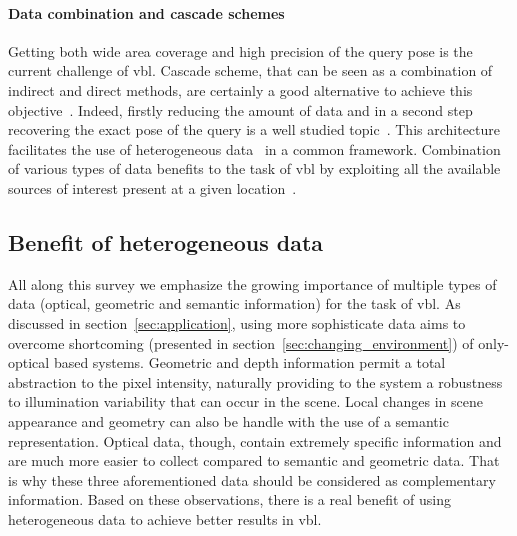         \paragraph{Data combination and cascade schemes}
        	Getting both wide area coverage and high precision of the query pose is the current challenge of \ac{vbl}. Cascade scheme, that can be seen as a combination of indirect and direct methods, are certainly a good alternative to achieve this objective~\citep{Sattler2017}. Indeed, firstly reducing the amount of data and in a second step recovering the exact pose of the query is a well studied topic~\citep{Rubio2015,Azzi2016,Song2016,Meng2016,Sattler2017}. This architecture facilitates the use of heterogeneous data~\citep{Lu2015} in a common framework. Combination of various types of data benefits to the task of \ac{vbl} by exploiting all the available sources of interest present at a given location~\citep{Li2016}.
            
	\subsection{Benefit of heterogeneous data}
    	All along this survey we emphasize the growing importance of multiple types of data (optical, geometric and semantic information) for the task of \ac{vbl}. As discussed in section~\ref{sec:application}, using more sophisticate data aims to overcome shortcoming (presented in section~\ref{sec:changing_environment}) of only-optical based systems. Geometric and depth information permit a total abstraction to the pixel intensity, naturally providing to the system a robustness to illumination variability that can occur in the scene. Local changes in scene appearance and geometry can also be handle with the use of a semantic representation. Optical data, though, contain extremely specific information and are much more easier to collect compared to semantic and geometric data. That is why these three aforementioned data should be considered as complementary information. Based on these observations, there is a real benefit of using heterogeneous data to achieve better results in \ac{vbl}.
		
